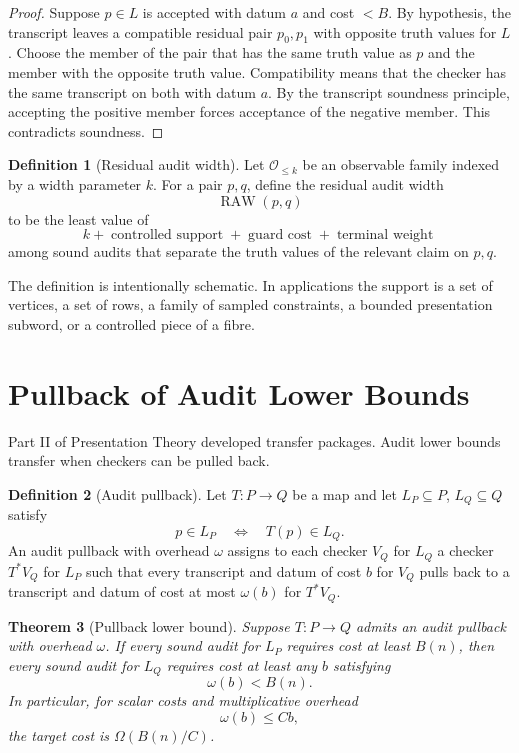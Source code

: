 \documentclass[11pt]{article}
\newtheorem{theorem}{Theorem}[section]
\theoremstyle{definition}
\newtheorem{definition}[theorem]{Definition}
\begin{document}
\begin{proof}
Suppose \(p\in L\) is accepted with datum \(a\) and cost \(<B\). By hypothesis, the transcript leaves a compatible residual pair \(p_0,p_1\) with opposite truth values for \(L\). Choose the member of the pair that has the same truth value as \(p\) and the member with the opposite truth value. Compatibility means that the checker has the same transcript on both with datum \(a\). By the transcript soundness principle, accepting the positive member forces acceptance of the negative member. This contradicts soundness.
\end{proof}

\begin{definition}[Residual audit width]
Let \(\mathcal O_{\leq k}\) be an observable family indexed by a width parameter \(k\). For a pair \(p,q\), define the residual audit width
\[
\operatorname{RAW}(p,q)
\]
to be the least value of
\[
k+\operatorname{controlled\ support}+\operatorname{guard\ cost}+\operatorname{terminal\ weight}
\]
among sound audits that separate the truth values of the relevant claim on \(p,q\).
\end{definition}

The definition is intentionally schematic. In applications the support is a set of vertices, a set of rows, a family of sampled constraints, a bounded presentation subword, or a controlled piece of a fibre.

\section{Pullback of Audit Lower Bounds}

Part II of Presentation Theory developed transfer packages. Audit lower bounds transfer when checkers can be pulled back.

\begin{definition}[Audit pullback]
Let \(T:P\to Q\) be a map and let \(L_P\subseteq P\), \(L_Q\subseteq Q\) satisfy
\[
p\in L_P\quad\Longleftrightarrow\quad T(p)\in L_Q.
\]
An audit pullback with overhead \(\omega\) assigns to each checker \(V_Q\) for \(L_Q\) a checker \(T^*V_Q\) for \(L_P\) such that every transcript and datum of cost \(b\) for \(V_Q\) pulls back to a transcript and datum of cost at most \(\omega(b)\) for \(T^*V_Q\).
\end{definition}

\begin{theorem}[Pullback lower bound]
Suppose \(T:P\to Q\) admits an audit pullback with overhead \(\omega\). If every sound audit for \(L_P\) requires cost at least \(B(n)\), then every sound audit for \(L_Q\) requires cost at least any \(b\) satisfying
\[
\omega(b)<B(n).
\]
In particular, for scalar costs and multiplicative overhead
\[
\omega(b)\leq Cb,
\]
the target cost is \(\Omega(B(n)/C)\).
\end{theorem}
\end{document}
